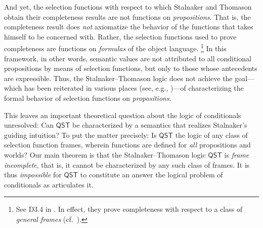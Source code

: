 \documentclass[12pt]{article}
\begin{document}
And yet, the selection functions with respect to which Stalnaker and Thomason obtain their completeness results are not functions on \emph{propositions}. That is, the completeness result does \emph{not} axiomatize the behavior of the functions that \cite{Stalnaker1968theory} takes himself to be concerned with. 
Rather, the selection functions used to prove completeness are functions on \emph{formulas} of the object language.%
\footnote{
    See D3.4 in \cite[p.~27]{StalnakerThomason1970}. 
    In effect, they prove completeness with respect to a class of \emph{general frames} (cf.~\cite{Segerberg1989}).
    } %
In this framework, in other words, semantic values are not attributed to all conditional propositions by means of selection functions, but only to those whose antecedents are expressible. 
Thus, the Stalnaker--Thomason logic does not achieve the goal---which has been reiterated in various places (see, e.g., \cite[Ch.~7]{Stalnaker1984})---of characterizing the formal behavior of selection functions on \emph{propositions}. 

This leaves an important theoretical question about the logic of conditionals unresolved: 
Can $\mathsf{QST}$ be characterized by a semantics that realizes Stalnaker's guiding intuition? 
To put the matter precisely: Is $\mathsf{QST}$ the logic of any class of selection function frames, wherein functions are defined for \textit{all} propositions and worlds? Our main theorem is that the Stalnaker--Thomason logic $\mathsf{QST}$ is \emph{frame incomplete}, that is, it cannot be characterized by any such class of frames. 
It is thus \emph{impossible} for $\mathsf{QST}$ to constitute an answer the logical problem of conditionals as \cite{Stalnaker1968theory} articulates it. 


\end{document}
